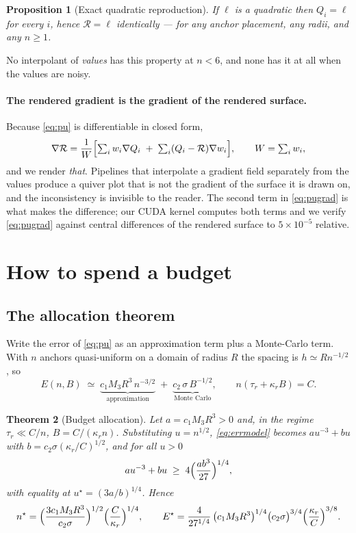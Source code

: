 \documentclass[11pt]{article}
\newtheorem{theorem}{Theorem}
\newtheorem{proposition}[theorem]{Proposition}
\theoremstyle{definition}
\newcommand{\Rec}{\mathcal{R}}
\begin{document}
\begin{proposition}[Exact quadratic reproduction]
\label{prop:repro}
If $\ell$ is a quadratic then $Q_i=\ell$ for every $i$, hence $\Rec=\ell$ identically
--- for any anchor placement, any radii, and any $n\ge1$.
\end{proposition}

No interpolant of \emph{values} has this property at $n<6$, and none has it at all when
the values are noisy.

\paragraph{The rendered gradient is the gradient of the rendered surface.} Because
\eqref{eq:pu} is differentiable in closed form,
\begin{equation}
  \label{eq:pugrad}
  \nabla\Rec = \frac{1}{W}\Bigl[\textstyle\sum_i w_i\nabla Q_i
    \;+\; \sum_i (Q_i-\Rec)\nabla w_i\Bigr],\qquad W=\sum_i w_i,
\end{equation}
and we render \emph{that}. Pipelines that interpolate a gradient field separately from
the values produce a quiver plot that is not the gradient of the surface it is drawn
on, and the inconsistency is invisible to the reader. The second term in
\eqref{eq:pugrad} is what makes the difference; our CUDA kernel computes both terms and
we verify \eqref{eq:pugrad} against central differences of the rendered surface to
$5\times10^{-5}$ relative.

\section{How to spend a budget}
\label{sec:allocate}

\subsection{The allocation theorem}

Write the error of \eqref{eq:pu} as an approximation term plus a Monte-Carlo term. With
$n$ anchors quasi-uniform on a domain of radius $R$ the spacing is $h\simeq Rn^{-1/2}$,
so
\begin{equation}
  \label{eq:errmodel}
  E(n,B)\;\simeq\;\underbrace{c_1 M_3 R^3\, n^{-3/2}}_{\text{approximation}}
  \;+\;\underbrace{c_2\,\sigma\,B^{-1/2}}_{\text{Monte Carlo}},
  \qquad n(\tau_r+\kappa_r B)=C .
\end{equation}

\begin{theorem}[Budget allocation]
\label{thm:alloc}
Let $a=c_1M_3R^3>0$ and, in the regime $\tau_r\ll C/n$, $B=C/(\kappa_r n)$. Substituting
$u=n^{1/2}$, \eqref{eq:errmodel} becomes $a u^{-3}+bu$ with
$b=c_2\sigma(\kappa_r/C)^{1/2}$, and for all $u>0$
\[
  a u^{-3}+bu \;\ge\; 4\Bigl(\frac{ab^3}{27}\Bigr)^{1/4},
\]
with equality at $u^\star=(3a/b)^{1/4}$. Hence
\[
  n^\star = \Bigl(\frac{3c_1M_3R^3}{c_2\sigma}\Bigr)^{1/2}
            \Bigl(\frac{C}{\kappa_r}\Bigr)^{1/4},
  \qquad
  E^\star = \frac{4}{27^{1/4}}\,\bigl(c_1M_3R^3\bigr)^{1/4}
            \bigl(c_2\sigma\bigr)^{3/4}
            \Bigl(\frac{\kappa_r}{C}\Bigr)^{3/8}.
\]
\end{theorem}
\end{document}
